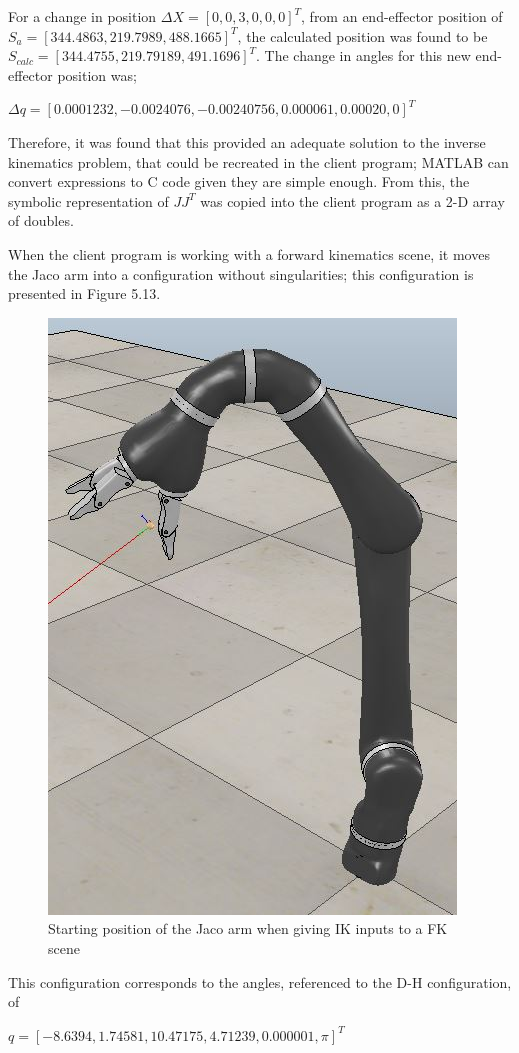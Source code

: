 \documentclass[12pt,openany,a4paper]{book}
\begin{document}
For a change in position $\Delta X = [0, 0, 3, 0, 0, 0]^T$, from an end-effector position of $S_a = [344.4863, 219.7989, 488.1665]^T$, the calculated position was found to be $S_{calc} = [ 344.4755, 219.79189, 491.1696]^T$. The change in angles for this new end-effector position was;

\begin{center}
$\Delta q = [0.0001232, -0.0024076, -0.00240756, 0.000061, 0.00020, 0]^T$
\end{center}

Therefore, it was found that this provided an adequate solution to the inverse kinematics problem, that could be recreated in the client program; MATLAB can convert expressions to C code given they are simple enough. From this, the symbolic representation of $J J^T$ was copied into the client program as a 2-D array of doubles. 

When the client program is working with a forward kinematics scene, it moves the Jaco arm into a configuration without singularities; this configuration is presented in Figure 5.13.

\begin{center}
\begin{figure}[htb]
  \includegraphics[width=0.5\linewidth]{jaco_start_config.jpg}
\caption{ Starting position of the Jaco arm when giving IK inputs to a FK scene }
\end{figure}
\end{center}

This configuration corresponds to the angles, referenced to the D-H configuration, of

\begin{center}
$q = [-8.6394, 1.74581, 10.47175, 4.71239, 0.000001, \pi]^T$
\end{center}
\end{document}
